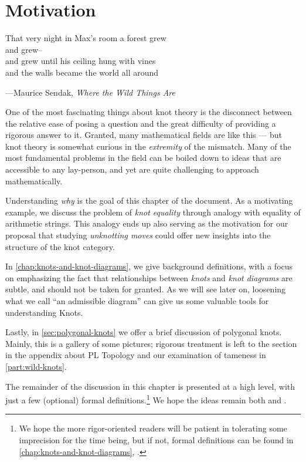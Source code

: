 \chapter{Motivation}\label{chap:motivation}
\setlength{}
\epigraph{That very night in Max's room a forest grew\\
and grew--\\
and grew until his ceiling hung with vines\\
and the walls became the world all around}{---Maurice Sendak,
\emph{Where the Wild Things Are}}


One of the most fascinating things about knot theory is the disconnect
between the relative ease of posing a question and the great
difficulty of providing a rigorous answer to it. Granted, many
mathematical fields are like this --- but knot theory is somewhat
curious in the \emph{extremity} of the mismatch. Many of the most
fundamental problems in the field can be boiled down to ideas that are
accessible to any lay-person, and yet are quite challenging to
approach mathematically.

Understanding \emph{why} is the goal of this chapter of the document.
As a motivating example, we discuss the problem of \emph{knot
  equality} through analogy with equality of arithmetic strings. This
analogy ends up also serving as the motivation for our proposal that
studying \emph{unknotting moves} could offer new insights into the
structure of the knot category.

In \cref{chap:knots-and-knot-diagrams}, we give background
definitions, with a focus on emphasizing the fact that relationships
between \emph{knots} and \emph{knot diagrams} are subtle, and should
not be taken for granted. As we will see later on, loosening what we
call ``an admissible diagram'' can give us some valuable tools for
understanding Knots.

Lastly, in \cref{sec:polygonal-knots} we offer a brief discussion of
polygonal knots. Mainly, this is a gallery of some pictures; rigorous
treatment is left to the section in the appendix about PL Topology and
our examination of tameness in \cref{part:wild-knots}.



The remainder of the discussion in this chapter is presented at a high
level, with just a few (optional) formal definitions.\footnote{We hope
  the more rigor-oriented readers will be patient in tolerating some
  imprecision for the time being, but if not, formal definitions can
  be found in \cref{chap:knots-and-knot-diagrams},
  .} We hope the ideas remain
both  and .
